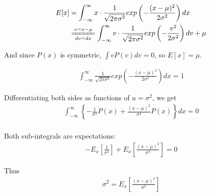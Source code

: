 \begin{problem}
  \begin{align*}
    E[x] &= \int_{-\infty}^{\infty} x \cdot \frac{1}{\sqrt{2\pi \sigma^2}}
      exp \left(-\frac{(x-\mu)^2}{2\sigma^2}\right) dx \\
         &\xlongequal[dv = dx]{v = x - \mu}
         \int_{-\infty}^{\infty} v \cdot \frac{1}{\sqrt{2\pi \sigma^2}}
         exp \left(-\frac{v^2}{2\sigma^2}\right) dv + \mu
  \end{align*}

  And since $P(x)$ is symmetric, $\int v P(v) dv = 0$, so $E[x] = \mu$.

  \begin{align*}
    \int_{-\infty}^{\infty} \frac{1}{\sqrt{2\pi \sigma^2}}
      exp \left(-\frac{(x-\mu)^2}{2\sigma^2}\right) dx = 1
  \end{align*}

  Differentiating both sides as functions of $u = \sigma^2$, we get
  \begin{align*}
    \int_{-\infty}^{\infty} \left\{ -\frac{1}{\sigma^2} P(x) +
                                     \frac{(x - \mu)^2}{\sigma^4} P(x)
                            \right\} dx = 0 \\
  \end{align*}

  Both sub-integrals are expectations:
  \begin{align*}
    -E_x\left[ \frac{1}{\sigma^2} \right] +
     E_x\left[ \frac{(x - \mu)^2}{\sigma^4} \right] = 0
  \end{align*}

  Thus
  \begin{align*}
    \sigma^2 = E_x\left[ \frac{(x - \mu)^2}{\sigma^2} \right]
  \end{align*}
\end{problem}